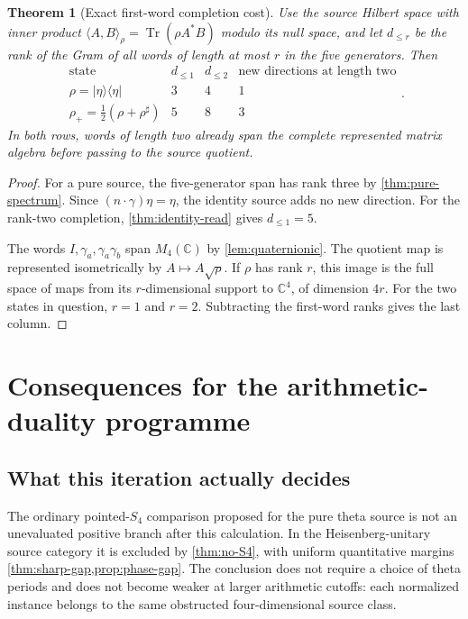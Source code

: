\documentclass[11pt]{article}
\newtheorem{theorem}{Theorem}[section]
\theoremstyle{definition}
\theoremstyle{remark}
\newcommand{\C}{\mathbb C}
\newcommand{\Tr}{\operatorname{Tr}}
\newcommand{\ip}[2]{\langle#1,#2\rangle}
\newcommand{\ketbra}[1]{|#1\rangle\langle#1|}
\begin{document}
\begin{theorem}[Exact first-word completion cost]
\label{thm:word-cost}
Use the source Hilbert space with inner product
$\ip{A}{B}_\rho=\Tr(\rho A^*B)$ modulo its null space, and let $d_{\le r}$
be the rank of the Gram of all words of length at most $r$ in the five
generators. Then
\begin{equation}
 \begin{array}{c|cc|c}
 \text{state}&d_{\le1}&d_{\le2}&\text{new directions at length two}\\\hline
 \rho=\ketbra\eta&3&4&1\\
 \rho_+=\tfrac12(\rho+\rho^\sharp)&5&8&3
 \end{array}.
 \label{eq:word-ranks}
\end{equation}
In both rows, words of length two already span the complete represented
matrix algebra before passing to the source quotient.
\end{theorem}
\begin{proof}
For a pure source, the five-generator span has rank three by
\cref{thm:pure-spectrum}. Since $(n\cdot\gamma)\eta=\eta$, the identity
source adds no new direction. For the rank-two completion,
\cref{thm:identity-read} gives $d_{\le1}=5$.

The words $I,\gamma_a,\gamma_a\gamma_b$ span $M_4(\C)$ by
\cref{lem:quaternionic}. The quotient map is represented isometrically by
$A\mapsto A\sqrt\rho$. If $\rho$ has rank $r$, this image is the full space
of maps from its $r$-dimensional support to $\C^4$, of dimension $4r$.
For the two states in question, $r=1$ and $r=2$. Subtracting the first-word
ranks gives the last column.
\end{proof}

\section{Consequences for the arithmetic-duality programme}
\label{sec:consequences}

\subsection{What this iteration actually decides}
The ordinary pointed-$S_4$ comparison proposed for the pure theta source is
not an unevaluated positive branch after this calculation. In the
Heisenberg-unitary source category it is excluded by
\cref{thm:no-S4}, with uniform quantitative margins
\cref{thm:sharp-gap,prop:phase-gap}. The conclusion does not require a
choice of theta periods and does not become weaker at larger arithmetic
cutoffs: each normalized instance belongs to the same obstructed
four-dimensional source class.
\end{document}
